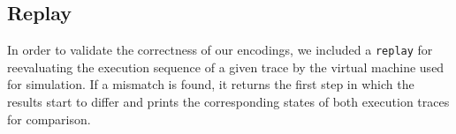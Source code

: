 \subsection{Replay}

In order to validate the correctness of our encodings, we included a \texttt{replay}  for reevaluating the execution sequence of a given trace by the virtual machine used for simulation.
If a mismatch is found, it returns the first step in which the results start to differ and prints the corresponding states of both execution traces for comparison.
